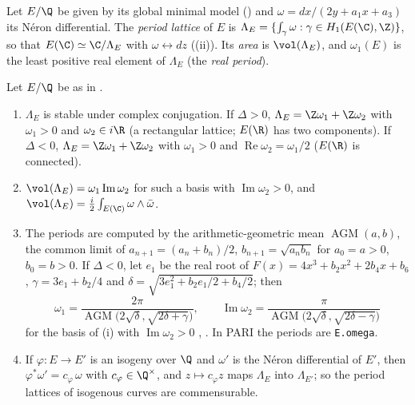 \begin{definition}\label{def:ellcurves:periodlattice}
Let $E/\Q$ be given by its global minimal model () and $\omega=dx/(2y+a_1x+a_3)$ its N\'eron differential. The \emph{period lattice} of $E$ is
$\Lambda_E=\{\int_\gamma\omega:\gamma\in H_1(E(\C),\Z)\}$, so that $E(\C)\simeq\C/\Lambda_E$ with $\omega\leftrightarrow dz$ ((ii)). Its \emph{area} is
$\vol(\Lambda_E)$, and $\omega_1(E)$ is the least positive real element of $\Lambda_E$ (the \emph{real period}).
\end{definition}

\begin{proposition}\label{prop:ellcurves:periods}
Let $E/\Q$ be as in .
\begin{enumerate}[label=(\roman*)]
\item $\Lambda_E$ is stable under complex conjugation. If $\Delta>0$, $\Lambda_E=\Z\omega_1+\Z\omega_2$ with $\omega_1>0$ and $\omega_2\in i\R$ (a rectangular lattice; $E(\R)$ has two components). If
$\Delta<0$, $\Lambda_E=\Z\omega_1+\Z\omega_2$ with $\omega_1>0$ and $\operatorname{Re}\omega_2=\omega_1/2$ ($E(\R)$ is connected).
\item $\vol(\Lambda_E)=\omega_1\operatorname{Im}\omega_2$ for such a basis with $\operatorname{Im}\omega_2>0$, and $\vol(\Lambda_E)=\frac i2\int_{E(\C)}\omega\wedge\bar\omega$.
\item The periods are computed by the arithmetic-geometric mean $\operatorname{AGM}(a,b)$, the common limit of $a_{n+1}=(a_n+b_n)/2$, $b_{n+1}=\sqrt{a_nb_n}$ for $a_0=a>0$,
$b_0=b>0$. If $\Delta<0$, let $e_1$ be the real root of $F(x)=4x^3+b_2x^2+2b_4x+b_6$, $\gamma=3e_1+b_2/4$ and $\delta=\sqrt{3e_1^2+b_2e_1/2+b_4/2}$; then
\[
\omega_1=\frac{2\pi}{\operatorname{AGM}\bigl(2\sqrt\delta,\sqrt{2\delta+\gamma}\bigr)},\qquad\operatorname{Im}\omega_2=\frac{\pi}{\operatorname{AGM}\bigl(2\sqrt\delta,\sqrt{2\delta-\gamma}\bigr)}
\]
for the basis of (i) with $\operatorname{Im}\omega_2>0$ \cite[Section 7.4]{Cohen93}, \cite[Section 3.7]{Cremona97}. In PARI the periods are \texttt{E.omega}.
\item If $\varphi\colon E\to E'$ is an isogeny over $\Q$ and $\omega'$ is the N\'eron differential of $E'$, then $\varphi^*\omega'=c_\varphi\,\omega$ with $c_\varphi\in\Q^\times$, and $z\mapsto c_\varphi z$ maps $\Lambda_E$ into
$\Lambda_{E'}$; so the period lattices of isogenous curves are commensurable.
\end{enumerate}
\end{proposition}


